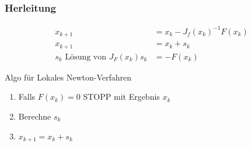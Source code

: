 \documentclass[
	ngerman,
	accentcolor=9c,%
	type=intern,
	marginpar=false
	]{tudapub}
\begin{document}
                \subsubsection{Herleitung}
                \begin{satz}
                    \begin{align*}
                        x_{k+1} &= x_k - J_{f}(x_k)^{-1}F(x_k)\\
                        x_{k+1} &= x_k + s_k\\
                        s_k \text{ Lösung von } J_F(x_k)s_k &= - F(x_k)
                    \end{align*}
                \end{satz}
                \begin{satz}
                    Algo für Lokales Newton-Verfahren
                    \begin{enumerate}
                        \item Falls $F(x_k) = 0$ STOPP mit Ergebnis $x_k$
                        \item Berechne $s_k$
                        \item $x_{k+1} = x_k + s_k$
                    \end{enumerate}
                \end{satz}
\end{document}
